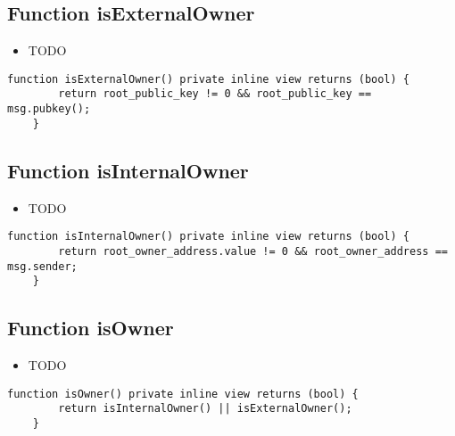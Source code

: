 \subsection{Function isExternalOwner}

\noindent\begin{itemize}
\item TODO
\end{itemize}

\begin{lstlisting}[firstnumber=477]
    function isExternalOwner() private inline view returns (bool) {
        return root_public_key != 0 && root_public_key == msg.pubkey();
    }
\end{lstlisting}

\subsection{Function isInternalOwner}

\noindent\begin{itemize}
\item TODO
\end{itemize}

\begin{lstlisting}[firstnumber=473]
    function isInternalOwner() private inline view returns (bool) {
        return root_owner_address.value != 0 && root_owner_address == msg.sender;
    }
\end{lstlisting}

\subsection{Function isOwner}

\noindent\begin{itemize}
\item TODO
\end{itemize}

\begin{lstlisting}[firstnumber=469]
    function isOwner() private inline view returns (bool) {
        return isInternalOwner() || isExternalOwner();
    }
\end{lstlisting}

